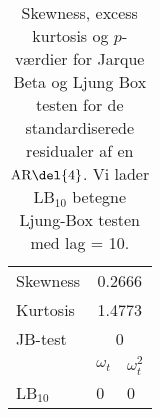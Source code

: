 \begin{table}
\center
\begin{tabular}{lll} \toprule
Skewness & \multicolumn{2}{c}{0.2666} \\
Kurtosis & \multicolumn{2}{c}{1.4773} \\
JB-test & \multicolumn{2}{c}{0} \\ \cmidrule{2-3}	
& $\omega_t$ & $\omega_t^2$ \\
LB$_{10}$ & 0 & 0  \\ \bottomrule
\end{tabular}
\caption{Skewness, excess kurtosis og \(p\)-værdier for Jarque Beta og Ljung Box testen for de standardiserede residualer af en \(\text{AR} \del{4}\). Vi lader LB$_{10}$ betegne Ljung-Box testen med lag = 10. } \label{tab:test_ar}
\end{table}